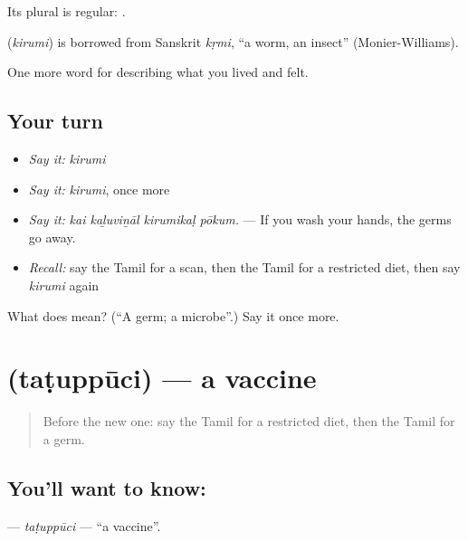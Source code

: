 Its plural is regular: .

\begin{cousinweb}
\textbf{} (\emph{kirumi}) is borrowed from Sanskrit \emph{kṛmi}, \textquotedblleft{}a worm, an insect\textquotedblright{} (Monier-Williams).
\end{cousinweb}

\begin{grammarlens}[title={What you've built}]
One more word for describing what you lived and felt.
\end{grammarlens}

\subsection*{Your turn}
\begin{itemize}
\raggedright
  \item \emph{Say it:} \emph{kirumi}
  \item \emph{Say it:} \emph{kirumi}, once more
  \item \emph{Say it:} \emph{kai kaḻuviṉāl kirumikaḷ pōkum.} — If you wash your hands, the germs go away.
  \item \emph{Recall:} say the Tamil for a scan, then the Tamil for a restricted diet, then say \emph{kirumi} again
\end{itemize}

\begin{tcolorbox}[breakable,colback=teal!4,colframe=teal!35!black,title={Before you move on}]
What does  mean? (\textquotedblleft{}A germ; a microbe\textquotedblright{}.) Say it once more.
\end{tcolorbox}
\section[\texorpdfstring{\ta{தடுப்பூசி} (taṭuppūci)}{தடுப்பூசி (taṭuppūci)}]{ (taṭuppūci) — a vaccine}

\label{lesson:TA-C476-tatuppuci}



\begin{quote}
Before the new one: say the Tamil for a restricted diet, then the Tamil for a germ.
\end{quote}

\subsection*{You'll want to know: }
\textbf{} — \emph{taṭuppūci} — \textquotedblleft{}a vaccine\textquotedblright{}.

